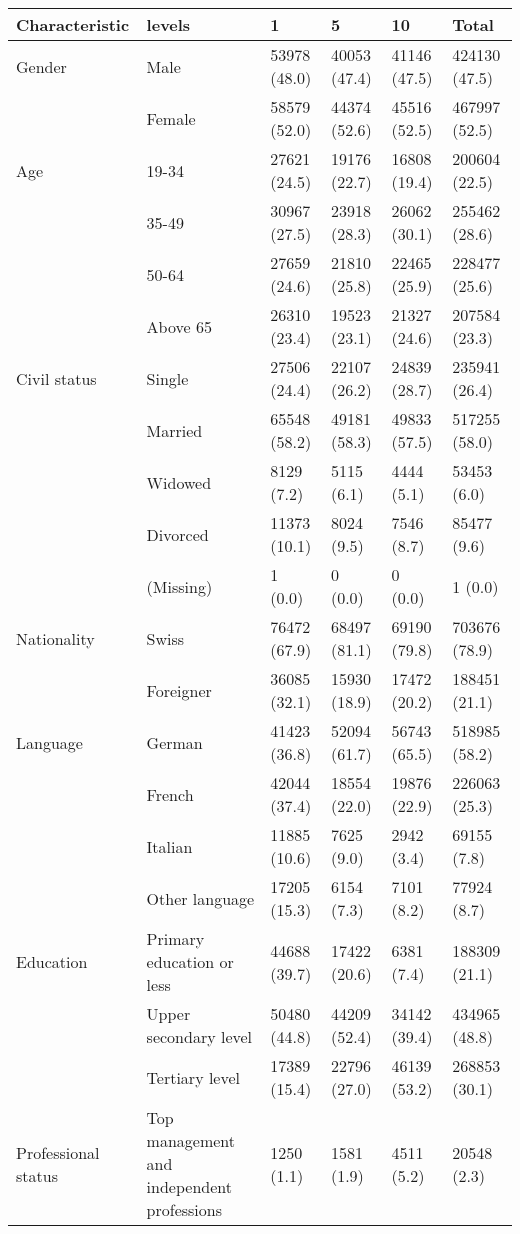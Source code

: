 
\begin{tabular}{llllll}
\toprule
Characteristic & levels & 1 & 5 & 10 & Total\\
\midrule
Gender & Male & 53978 (48.0) & 40053 (47.4) & 41146 (47.5) & 424130 (47.5)\\
 & Female & 58579 (52.0) & 44374 (52.6) & 45516 (52.5) & 467997 (52.5)\\
\addlinespace
Age & 19-34 & 27621 (24.5) & 19176 (22.7) & 16808 (19.4) & 200604 (22.5)\\
 & 35-49 & 30967 (27.5) & 23918 (28.3) & 26062 (30.1) & 255462 (28.6)\\
 & 50-64 & 27659 (24.6) & 21810 (25.8) & 22465 (25.9) & 228477 (25.6)\\
 & Above 65 & 26310 (23.4) & 19523 (23.1) & 21327 (24.6) & 207584 (23.3)\\
\addlinespace
Civil status & Single & 27506 (24.4) & 22107 (26.2) & 24839 (28.7) & 235941 (26.4)\\
 & Married & 65548 (58.2) & 49181 (58.3) & 49833 (57.5) & 517255 (58.0)\\
 & Widowed & 8129 (7.2) & 5115 (6.1) & 4444 (5.1) & 53453 (6.0)\\
 & Divorced & 11373 (10.1) & 8024 (9.5) & 7546 (8.7) & 85477 (9.6)\\
 & (Missing) & 1 (0.0) & 0 (0.0) & 0 (0.0) & 1 (0.0)\\
\addlinespace
Nationality & Swiss & 76472 (67.9) & 68497 (81.1) & 69190 (79.8) & 703676 (78.9)\\
 & Foreigner & 36085 (32.1) & 15930 (18.9) & 17472 (20.2) & 188451 (21.1)\\
\addlinespace
Language & German & 41423 (36.8) & 52094 (61.7) & 56743 (65.5) & 518985 (58.2)\\
 & French & 42044 (37.4) & 18554 (22.0) & 19876 (22.9) & 226063 (25.3)\\
 & Italian & 11885 (10.6) & 7625 (9.0) & 2942 (3.4) & 69155 (7.8)\\
 & Other language & 17205 (15.3) & 6154 (7.3) & 7101 (8.2) & 77924 (8.7)\\
\addlinespace
Education & Primary education or less & 44688 (39.7) & 17422 (20.6) & 6381 (7.4) & 188309 (21.1)\\
 & Upper secondary level & 50480 (44.8) & 44209 (52.4) & 34142 (39.4) & 434965 (48.8)\\
 & Tertiary level & 17389 (15.4) & 22796 (27.0) & 46139 (53.2) & 268853 (30.1)\\
\addlinespace
Professional status & Top management and independent professions & 1250 (1.1) & 1581 (1.9) & 4511 (5.2) & 20548 (2.3)\\

\end{tabular}
